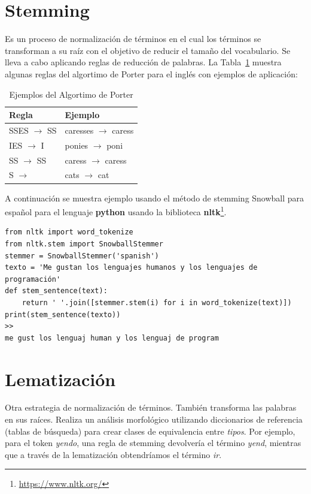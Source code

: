 \section{Stemming}

Es un proceso de normalización de términos en el cual los términos se transforman a su raíz con el objetivo de reducir el tamaño del vocabulario. Se lleva a cabo aplicando reglas de reducción de palabras. La Tabla~\ref{tab:porter} muestra  algunas reglas del algortimo de Porter para el inglés con ejemplos de aplicación:

\begin{table}[h]
\centering
\begin{tabular}{|l|l|}
\hline
Regla & Ejemplo \\
\hline
SSES $\rightarrow$ SS & caresses $\rightarrow$ caress \\
IES $\rightarrow$ I & ponies $\rightarrow$ poni \\
SS $\rightarrow$ SS & caress $\rightarrow$ caress \\
S $\rightarrow$ & cats $\rightarrow$ cat \\
\hline
\end{tabular}
\caption{Ejemplos del Algortimo de Porter}
\label{tab:porter}
\end{table}

\begin{example}

A continuación se muestra ejemplo usando el método de stemming Snowball para español para el lenguaje \textbf{python} usando la biblioteca \textbf{nltk}\footnote{\url{https://www.nltk.org/}}.

\begin{verbatim}
from nltk import word_tokenize
from nltk.stem import SnowballStemmer
stemmer = SnowballStemmer('spanish')
texto = 'Me gustan los lenguajes humanos y los lenguajes de programación'
def stem_sentence(text):
    return ' '.join([stemmer.stem(i) for i in word_tokenize(text)])    
print(stem_sentence(texto))
>>
me gust los lenguaj human y los lenguaj de program
\end{verbatim} 
\end{example}




\section{Lematización}
Otra estrategia de normalización de términos. También transforma las palabras en sus raíces.  Realiza un análisis morfológico utilizando diccionarios de referencia (tablas de búsqueda) para crear clases de equivalencia entre \emph{tipos}. Por ejemplo, para el token \emph{yendo}, una regla de stemming devolvería el término \emph{yend}, mientras que a través de la lematización obtendríamos el término \emph{ir}.

